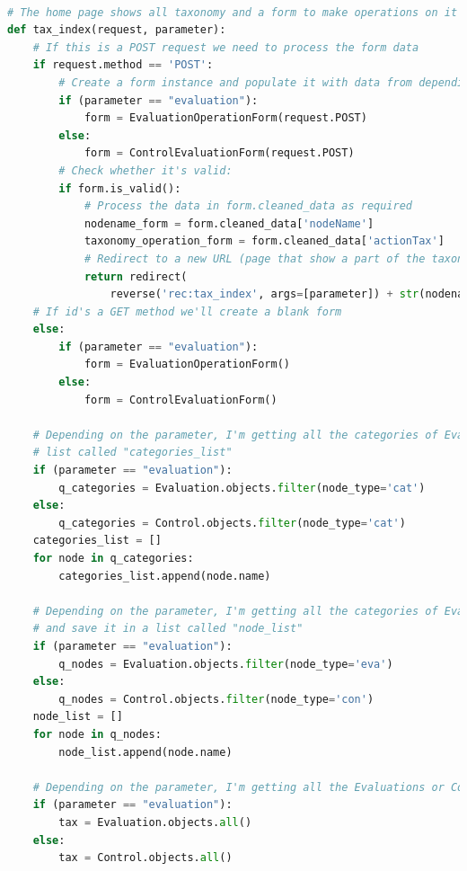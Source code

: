 \begin{lstlisting}[language=Python, caption={Parti principali del codice delle View della soluzione per gestire la navigazione 
    delle tassonomie, quella delle Evaluation e quella dei Controlli}]
 
# The home page shows all taxonomy and a form to make operations on it
def tax_index(request, parameter):
    # If this is a POST request we need to process the form data
    if request.method == 'POST':
        # Create a form instance and populate it with data from depending on the parameter
        if (parameter == "evaluation"):
            form = EvaluationOperationForm(request.POST)
        else:
            form = ControlEvaluationForm(request.POST)
        # Check whether it's valid:
        if form.is_valid():
            # Process the data in form.cleaned_data as required
            nodename_form = form.cleaned_data['nodeName']
            taxonomy_operation_form = form.cleaned_data['actionTax']
            # Redirect to a new URL (page that show a part of the taxonomy, depending on the action user has chosen):
            return redirect(
                reverse('rec:tax_index', args=[parameter]) + str(nodename_form) + '_' + taxonomy_operation_form)
    # If id's a GET method we'll create a blank form
    else:
        if (parameter == "evaluation"):
            form = EvaluationOperationForm()
        else:
            form = ControlEvaluationForm()
 
    # Depending on the parameter, I'm getting all the categories of Evaluations or Controls taxonomy and save it in a
    # list called "categories_list"
    if (parameter == "evaluation"):
        q_categories = Evaluation.objects.filter(node_type='cat')
    else:
        q_categories = Control.objects.filter(node_type='cat')
    categories_list = []
    for node in q_categories:
        categories_list.append(node.name)
 
    # Depending on the parameter, I'm getting all the categories of Evaluations or Controls node in the taxonomy
    # and save it in a list called "node_list"
    if (parameter == "evaluation"):
        q_nodes = Evaluation.objects.filter(node_type='eva')
    else:
        q_nodes = Control.objects.filter(node_type='con')
    node_list = []
    for node in q_nodes:
        node_list.append(node.name)
 
    # Depending on the parameter, I'm getting all the Evaluations or Controls taxonomy
    if (parameter == "evaluation"):
        tax = Evaluation.objects.all()
    else:
        tax = Control.objects.all()
 

\end{lstlisting}
